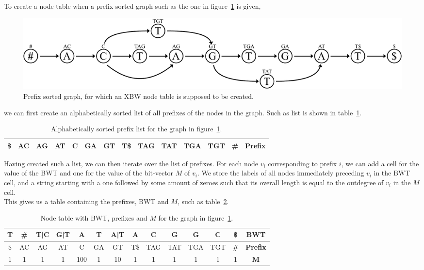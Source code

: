 \documentclass[a4paper,12pt,twoside,BCOR=10mm]{scrbook}
\begin{document}
To create a node table when a prefix sorted graph such as the one in figure~\ref{fig:evo_fig_node_construct_prefixes} is given, 
\begin{figure}[!htb]
\centering
\includegraphics[width=\textwidth]{evo_fig_node_construct_prefixes.pdf}
\caption[Prefix sorted graph]{Prefix sorted graph, for which an XBW node table is supposed to be created.} \label{fig:evo_fig_node_construct_prefixes}
\end{figure}
we can first create 
an alphabetically sorted list of all prefixes of the nodes in the graph. 
Such as list is shown in table~\ref{table:node_construct_prefixes_1}.

\begin{table}[htb]
\centering
\caption[Alphabetically sorted prefix list]{Alphabetically sorted prefix list for the graph in figure~\ref{fig:evo_fig_node_construct_prefixes}.}
\begin{tabular}{ | c | c | c | c | c | c | c | c | c | c | c | c | c | c | }
\hline
\$ & AC & AG & AT & C & GA & GT & T\$ & TAG & TAT & TGA & TGT & \textbf{\#} & \textbf{Prefix} \\ \hline 
\end{tabular}
\label{table:node_construct_prefixes_1}
\end{table}

Having created such a list, we can then iterate over the list of prefixes. 
For each node $ v_i $ corresponding to prefix $ i $, 
we can add a cell for the value of the BWT and one for the value of the bit-vector $ M $ of $ v_i $. 
We store the labels of all nodes immediately 
preceding $ v_i $ in the BWT cell, 
and a string starting with a one followed by some amount of zeroes 
such that its overall length is equal to the outdegree of $ v_i $ in the $ M $ cell. \\
This gives us a table containing the prefixes, BWT and $ M $, such as table~\ref{table:node_construct_prefixes_2}.

\begin{table}[htb]
\centering
\caption[Node table with BWT, prefixes and $ M $]{Node table with BWT, prefixes and $ M $ for the graph in figure~\ref{fig:evo_fig_node_construct_prefixes}.}
\begin{tabular}{ | c | c | c | c | c | c | c | c | c | c | c | c | c | c | }
\hline
T & \textbf{\#} & T|C & G|T & A & T & A|T & A & C & G & G & C & \$ & \textbf{BWT} \\ \hline 
\$ & AC & AG & AT & C & GA & GT & T\$ & TAG & TAT & TGA & TGT & \textbf{\#} & \textbf{Prefix} \\ \hline 
1 & 1 & 1 & 1 & 100 & 1 & 10 & 1 & 1 & 1 & 1 & 1 & 1 & $\boldsymbol{M}$ \\ \hline 
\end{tabular}
\label{table:node_construct_prefixes_2}
\end{table}
\end{document}
